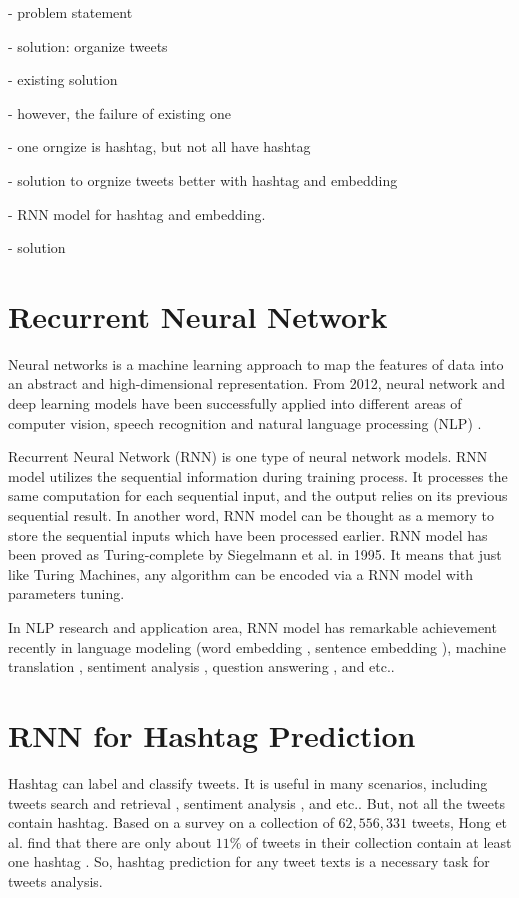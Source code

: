 - problem statement

- solution: organize tweets

- existing solution

- however, the failure of existing one

- one orngize is hashtag, but not all have hashtag

- solution to orgnize tweets better with hashtag and embedding
 
- RNN model for hashtag and embedding. 

- solution 



\section{Recurrent Neural Network}
Neural networks is a machine learning approach to map the features of data into an abstract and high-dimensional representation. From 2012, neural network and deep learning models have been successfully applied into different areas of computer vision, speech recognition and natural language processing (NLP) \cite{LeCun2015}. 

Recurrent Neural Network (RNN) is one type of neural network models. RNN model utilizes the sequential information during training process. It processes the same computation for each sequential input, and the output relies on its previous sequential result. In another word, RNN model can be thought as a memory to store the sequential inputs which have been processed earlier.  RNN model has been proved as Turing-complete by Siegelmann et al.\cite{Siegelmann1995} in 1995. It means that just like Turing Machines, any algorithm can be encoded via a RNN model with parameters tuning. 

In NLP research and application area, RNN model has remarkable achievement recently in language modeling (word embedding \cite{Mikolov2013}, sentence embedding \cite{Kiros2015}), machine translation \cite{Sutskever2014}, sentiment analysis \cite{Socher2013}, question answering \cite{Iyyer2014}, and etc.. 

\section{RNN for Hashtag Prediction}

Hashtag can label and classify tweets. It is useful in many scenarios, including tweets search and retrieval \cite{Efron2010}, sentiment analysis \cite{Davidov2010}, and etc.. But, not all the tweets contain hashtag. Based on a survey on a collection of $62,556,331$ tweets, Hong et al. find that there are only about $11\%$ of tweets in their collection contain at least one hashtag \cite{Hong2011a}. So, hashtag prediction for any tweet texts is a necessary task for tweets analysis. 

